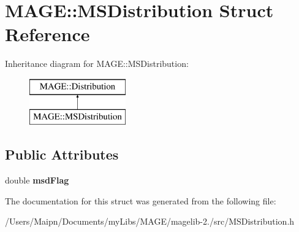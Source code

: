 \hypertarget{struct_m_a_g_e_1_1_m_s_distribution}{\section{M\-A\-G\-E\-:\-:M\-S\-Distribution Struct Reference}
\label{struct_m_a_g_e_1_1_m_s_distribution}
}
Inheritance diagram for M\-A\-G\-E\-:\-:M\-S\-Distribution\-:\begin{figure}[H]
\begin{center}
\leavevmode
\includegraphics[height=2.000000cm]{struct_m_a_g_e_1_1_m_s_distribution}
\end{center}
\end{figure}
\subsection*{Public Attributes}
\begin{DoxyCompactItemize}
\item 
\hypertarget{struct_m_a_g_e_1_1_m_s_distribution_a0ed9157691205923f9555223b473387a}{double {\bfseries msd\-Flag}}\label{struct_m_a_g_e_1_1_m_s_distribution_a0ed9157691205923f9555223b473387a}

\end{DoxyCompactItemize}


The documentation for this struct was generated from the following file\-:\begin{DoxyCompactItemize}
\item 
/\-Users/\-Maipn/\-Documents/my\-Libs/\-M\-A\-G\-E/magelib-\/2./src/M\-S\-Distribution.\-h\end{DoxyCompactItemize}
